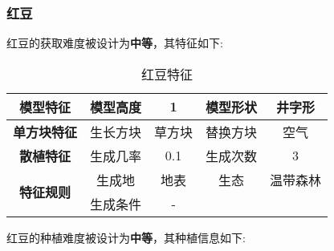 \subsubsection{红豆}

红豆的获取难度被设计为\textbf{中等}，其特征如下:
\begin{table}[H]
    \centering
    \caption{红豆特征}
    \label{table:红豆特征}
    \setlength{\tabcolsep}{4mm}
    \begin{tabular}{c|cc|cc}
        \toprule
        \textbf{模型特征}                  & 模型高度 & 1      & 模型形状 & 井字形 \\
        \midrule
        \textbf{单方块特征}                & 生长方块 & 草方块 & 替换方块 & 空气   \\
        \midrule
        \textbf{散植特征}                  & 生成几率 & 0.1    & 生成次数 & 3      \\
        \midrule
        \multirow{2}{*}{\textbf{特征规则}} & 生成地   & 地表   & 生态     & 温带森林   \\
                                           & 生成条件 & -              \\
        \bottomrule
    \end{tabular}
\end{table}


红豆的种植难度被设计为\textbf{中等}，其种植信息如下:

